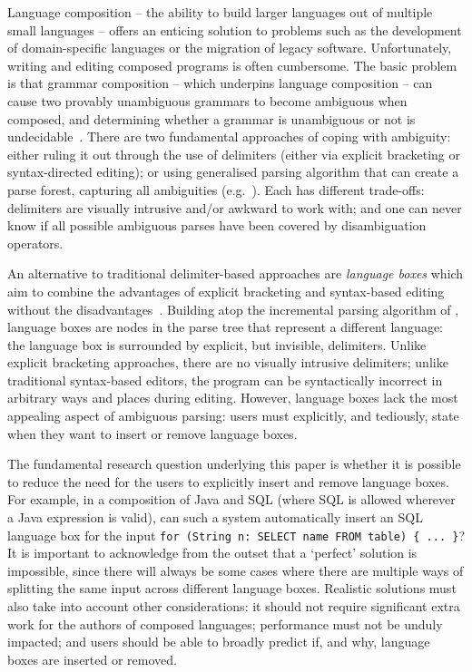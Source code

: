 \documentclass[sigplan,screen]{acmart}\settopmatter{printfolios=true,printccs=false,printacmref=false}
\begin{document}
Language composition -- the ability to build larger languages out of multiple
small languages -- offers an enticing solution to problems such as the
development of domain-specific languages or the migration of legacy software.
Unfortunately, writing and editing composed programs is often cumbersome.
The basic problem is that grammar
composition -- which underpins language composition -- can cause
two provably unambiguous grammars to become ambiguous when composed,
and determining whether a grammar is unambiguous or not is
undecidable~\cite{cantor62ambiguity}. There are two fundamental approaches
of coping with ambiguity: either ruling it out through the use of
delimiters (either via explicit bracketing or syntax-directed
editing); or using generalised parsing algorithm that can create a parse
forest, capturing all ambiguities
(e.g.~\cite{visser97scannerless}). Each has different trade-offs: delimiters
are visually intrusive and/or awkward to work with; and one can never know if all possible
ambiguous parses have been covered by disambiguation operators.

An alternative to traditional delimiter-based approaches are \emph{language boxes} which aim to
combine the advantages of explicit bracketing and syntax-based
editing without the disadvantages~\cite{diekmann14eco}. Building atop the
incremental parsing algorithm
of \citet{wagner98practicalalgorithms}, language boxes are nodes in the parse
tree that represent a different language: the language box is surrounded by
explicit, but invisible, delimiters. Unlike explicit bracketing approaches,
there are no visually intrusive delimiters; unlike traditional
syntax-based editors, the program can be syntactically incorrect in arbitrary
ways and places during editing. However, language boxes lack the most appealing aspect of
ambiguous parsing: users must explicitly, and tediously, state when they want
to insert or remove language boxes.

The fundamental research question underlying this paper is whether it is
possible to reduce the need for the users to explicitly insert and remove language
boxes. For example, in a composition of Java and SQL (where SQL is allowed
wherever a Java expression is valid), can such a system automatically insert an
SQL language box for the input \texttt{for (String n: SELECT name FROM table) \{ ...
\}}? It is important to acknowledge from the outset that a `perfect' solution
is impossible, since there will always be some cases where there are multiple
ways of splitting the same input across different language boxes. Realistic
solutions must also take into account other considerations: it should not
require significant extra work for the authors of composed languages; performance must
not be unduly impacted; and users should be able to broadly predict if, and
why, language boxes are inserted or removed.
\end{document}
